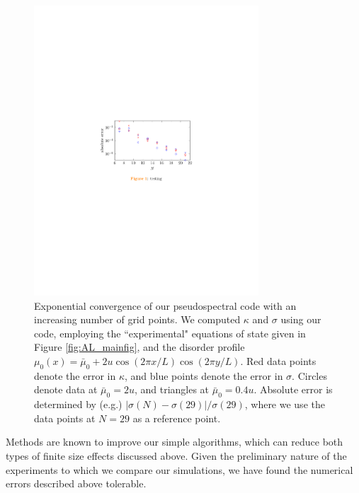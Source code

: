 \begin{figure}[t]
\centering
\includegraphics[width=3.3in]{figures/appendix/theory/spectralplot.pdf}
\caption{Exponential convergence of our pseudospectral code with an increasing number of grid points.  We computed $\kappa$ and $\sigma$ using our  code, employing the ``experimental" equations of state given in Figure \ref{fig:AL_mainfig},  and the disorder profile $\mu_0(x) = \bar\mu_0 + 2u\cos(2\pi x/L)\cos(2\pi y/L)$.   Red data points denote the error in $\kappa$, and blue points denote the error in $\sigma$.   Circles denote data at $\bar\mu_0 = 2u$, and triangles at $\bar\mu_0 = 0.4u$.  Absolute error is determined by (e.g.) $|\sigma(N)-\sigma(29)|/\sigma(29)$,  where we use the data points at $N=29$ as a reference point.}
\label{fig:AL_spectralfig}
\end{figure}

Methods are known to improve our simple algorithms, which can reduce both types of finite size effects discussed above.   Given the preliminary nature of the experiments to which we compare our simulations, we have found the numerical errors described above tolerable.

